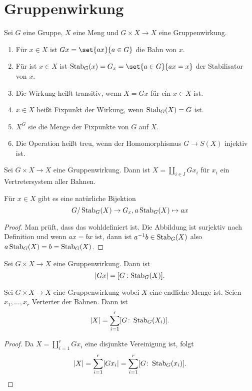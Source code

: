 \section{Gruppenwirkung}
\begin{Def}
    Sei \(G\) eine Gruppe, \(X\) eine Meng und \(G\times X\to X\) eine Gruppenwirkung.
    \begin{enumerate}
        \item Für \(x\in X\) ist \(Gx=\set{ax}{a\in G}\) die Bahn von \(x\).
        \item Für ist \(x\in X\) ist \(\Stab_G(x)=G_x=\set{a\in G}{ax=x}\) der Stabilisator von \(x\).
        \item Die Wirkung heißt transitiv, wenn \(X=Gx\) für ein \(x\in X\) ist.
        \item \(x\in X\) heißt Fixpunkt der Wirkung, wenn \(\operatorname{Stab}_G(X)=G\) ist.
        \item \(X^G\) sie die Menge der Fixpunkte von \(G\) auf \(X\).
        \item Die Operation heißt treu, wenn der Homomorphismus \(G\to S(X)\) injektiv ist.
    \end{enumerate}
\end{Def}
\begin{Bem}
    Sei \(G\times X\to X\) eine Gruppenwirkung. Dann ist \(X=\coprod _{i\in I}Gx_i\) für \(x_i\) ein Vertretersystem aller Bahnen.
\end{Bem}
\begin{Lemma}\label{Lem:Bahnengleichung1}
    Für \(x\in X\) gibt es eine natürliche Bijektion 
    \[G/\operatorname{Stab}_G(X)\to G_x, a\operatorname{Stab}_G(X)\mapsto ax\]
\end{Lemma}
\begin{proof}
    Man prüft, dass das wohldefiniert ist. Die Abbildung ist surjektiv nach Definition und wenn \(ax=bx\) ist, dann ist \(a^{-1}b\in\operatorname{Stab}_G(X)\) also \(a\operatorname{Stab}_G(X)=b=\operatorname{Stab}_G(X)\).
\end{proof}
\begin{Kor}
    Sei \(G\times X\to X\) eine Gruppenwirkung. Dann ist 
    \[\lvert Gx\rvert=[G:\operatorname{Stab}_G(X)].\]
\end{Kor}
\begin{Satz}[Bahnengleichung]\label{Satz:Bahnengleichung}
    Sei \(G\times X\to X\) eine Gruppenwirkung wobei \(X\) eine endliche Menge ist. Seien \(x_1,\dots,x_r\) Verterter der Bahnen. Dann ist 
    \[\lvert X\rvert=\sum_{i=1}^r[G\colon\operatorname{Stab}_G(X_i)].\]
\end{Satz}
\begin{proof}
    Da \(X=\coprod_{i=1}^rGx_i\) eine disjunkte Vereinigung ist, folgt 
    \[\lvert X\rvert=\sum_{i=1}^r\lvert Gx_i\rvert=\sum_{i=1}^r[G\colon\operatorname{Stab}_G(x_i)].\]
\end{proof}
